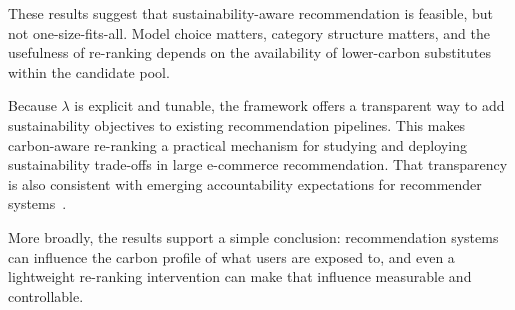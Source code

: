 \documentclass[11pt]{article}
\begin{document}
These results suggest that sustainability-aware recommendation is feasible, but not
one-size-fits-all. Model choice matters, category structure matters, and the usefulness of
re-ranking depends on the availability of lower-carbon substitutes within the candidate
pool.

Because $\lambda$ is explicit and tunable, the framework offers a transparent way to add
sustainability objectives to existing recommendation pipelines. This makes carbon-aware
re-ranking a practical mechanism for studying and deploying sustainability trade-offs in
large e-commerce recommendation. That transparency is also consistent with emerging
accountability expectations for recommender systems~\cite{dsa2022}.

More broadly, the results support a simple conclusion: recommendation systems can influence
the carbon profile of what users are exposed to, and even a lightweight re-ranking
intervention can make that influence measurable and controllable.




\end{document}
